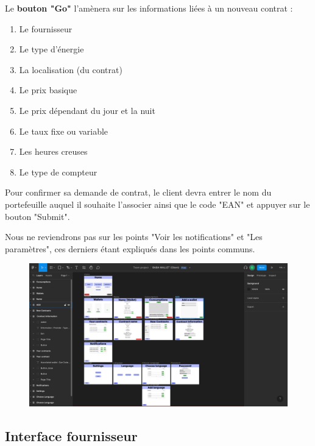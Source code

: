 \begin{flushleft}
Le \textbf{bouton "Go"} l'amènera sur les informations liées à un nouveau contrat :
\end{flushleft}
\begin{enumerate}
\item Le fournisseur
\item Le type d'énergie
\item La localisation (du contrat)
\item Le prix basique
\item Le prix dépendant du jour et la nuit
\item Le taux fixe ou variable
\item Les heures creuses
\item Le type de compteur
\end{enumerate}
\begin{flushleft}
Pour confirmer sa demande de contrat, le client devra entrer le nom du portefeuille auquel il souhaite l'associer ainsi que le code "EAN" et appuyer sur le bouton "Submit".
\end{flushleft}

\begin{flushleft}
Nous ne reviendrons pas sur les points "Voir les notifications" et "Les paramètres", ces derniers étant expliqués dans les points communs. 
\end{flushleft}

\begin{figure}
    \centering
    \includegraphics[width = 1\textwidth]{Base/interface/img/Client.pdf}
\end{figure}

\newpage
\subsection{Interface fournisseur}

